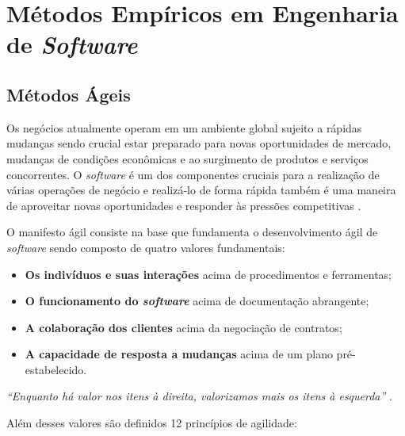 \chapter{Métodos Empíricos em Engenharia de \textit{Software}}

\section{Métodos Ágeis}
Os negócios atualmente operam em um ambiente global sujeito a rápidas mudanças sendo crucial
estar preparado para novas oportunidades de mercado, mudanças de condições econômicas e ao surgimento
de produtos e serviços concorrentes. O \textit{software} é um dos componentes cruciais para a realização
de várias operações de negócio e realizá-lo de forma rápida também é uma maneira de aproveitar novas
oportunidades e responder às pressões competitivas \cite{sommerville_2006}.

O manifesto ágil \cite{beck2001agile} consiste na base que fundamenta o desenvolvimento ágil de
\textit{software} sendo composto de quatro valores fundamentais:

\begin{itemize}
    \item \textbf{Os indivíduos e suas interações} acima de procedimentos e ferramentas;
    \item \textbf{O funcionamento do \textit{software}} acima de documentação abrangente;
    \item \textbf{A colaboração dos clientes} acima da negociação de contratos;
    \item \textbf{A capacidade de resposta a mudanças} acima de um plano pré-estabelecido.
\end{itemize}

\textit{``Enquanto há valor nos itens à direita, valorizamos mais os itens à esquerda''} \cite{beck2001agile}.

Além desses valores são definidos 12 princípios de agilidade:


